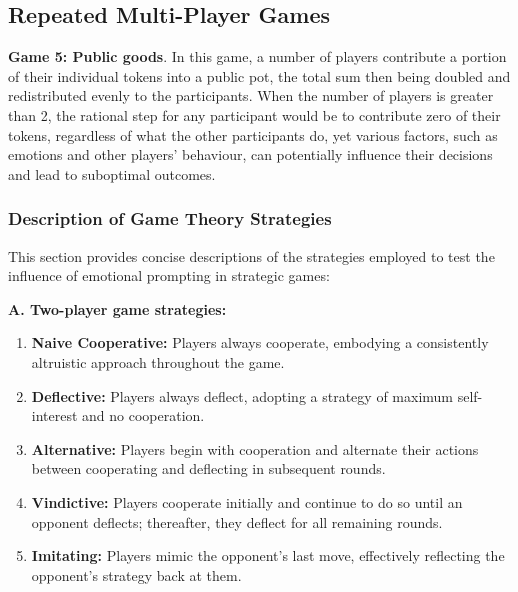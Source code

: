 \documentclass{article}
\begin{document}


\subsection{Repeated Multi-Player Games} \label{app: Rep_mult_games}

\textbf{Game 5: Public goods}. In this game, a number of players contribute a portion of their individual tokens into a public pot, the total sum then being doubled and redistributed evenly to the participants. When the number of players is greater than 2, the rational step for any participant would be to contribute zero of their tokens, regardless of what the other participants do, yet various factors, such as emotions and other players' behaviour, can potentially influence their decisions and lead to suboptimal outcomes.


\subsubsection*{Description of Game Theory Strategies} \label{app: des_theory}

This section provides concise descriptions of the strategies employed to test the influence of emotional prompting in strategic games:

\textbf{A. Two-player game strategies:}

\begin{enumerate}
    \item \textbf{Naive Cooperative:} Players always cooperate, embodying a consistently altruistic approach throughout the game.
    
    \item \textbf{Deflective:} Players always deflect, adopting a strategy of maximum self-interest and no cooperation.
    
    \item \textbf{Alternative:} Players begin with cooperation and alternate their actions between cooperating and deflecting in subsequent rounds.
    
    \item \textbf{Vindictive:} Players cooperate initially and continue to do so until an opponent deflects; thereafter, they deflect for all remaining rounds.
    
    \item \textbf{Imitating:} Players mimic the opponent’s last move, effectively reflecting the opponent’s strategy back at them.
\end{enumerate}
\end{document}
